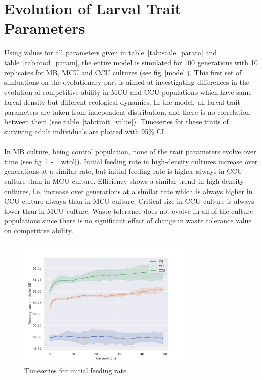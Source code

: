 \clearpage
\section{Evolution of Larval Trait Parameters}
Using values for all parameters given in table~\ref{tab:scale_param} and table~\ref{tab:food_param}, the entire model is simulated for 100 generations with 10 replicates for MB, MCU and CCU cultures (see fig~\ref{model}). This first set of simluations on the evolutionary part is aimed at investigating differences in the evolution of competitive ability in MCU and CCU populations which have same larval density but different ecological dynamics. In the model, all larval trait parameters are taken from independent distribution, and there is no correlation between them (see table~\ref{tab:trait_value}). Timeseries for these traits of surviving adult individuals are plotted with 95$\%$ CI.\\ \\
In MB culture, being control population, none of the trait parameters evolve over time (see fig~\ref{fr} - ~\ref{wtol}). Initial feeding rate in high-density cultures increase over generations at a similar rate, but initial feeding rate is higher always in CCU culture than in MCU culture. Efficiency shows a similar trend in high-density cultures, i.e. increase over generations at a similar rate which is always higher in CCU culture always than in MCU culture. Critical size in CCU culture is always lower than in MCU culture. Waste tolerance does not evolve in all of the culture populations since there is no significant effect of change in waste tolerance value on competitive ability.
\begin{figure}[h]
  \centering
  \includegraphics[trim = 0 0 50 50, clip, width=0.75\textwidth]{C4/Figs/fr}
  \caption{Timeseries for initial feeding rate}
  \label{fr}
\end{figure}
